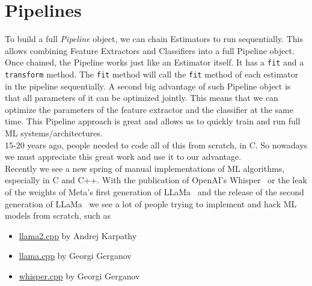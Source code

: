 \section{Pipelines}
To build a full \textit{Pipeline} object, we can chain Estimators to run sequentially. This allows combining Feature Extractors and Classifiers into a full Pipeline object.
Once chained, the Pipeline works just like an Estimator itself. It has a \lstinline{fit} and a \lstinline{transform} method. The \lstinline{fit} method will call the \lstinline{fit} method of each estimator in the pipeline sequentially.
A second big advantage of such Pipeline object is that all parameters of it can be optimized jointly. This means that we can optimize the parameters of the feature extractor and the classifier at the same time.
This Pipeline approach is great and allows us to quickly train and run full ML systems/architectures.\\
15-20 years ago, people needed to code all of this from scratch, in C.
So nowadays we must appreciate this great work and use it to our advantage.\\
Recently we see a new spring of manual implementations of ML algorithms, especially in C and C++.
With the publication of OpenAI's Whisper~\cite{radford2022whisper} or the leak of the weights of Meta's first generation of LLaMa~\cite{llama} and the release of the second generation of LLaMa~\cite{llama2} we see a lot of people trying to implement and hack ML models from scratch, such as
\begin{itemize}
  \item \href{https://github.com/karpathy/llama2.cpp}{llama2.cpp} by Andrej Karpathy
  \item \href{https://github.com/ggerganov/llama.cpp}{llama.cpp} by Georgi Gerganov
  \item \href{https://github.com/ggerganov/whisper.cpp}{whisper.cpp} by Georgi Gerganov
\end{itemize}

\framedtext{\color{red}{TODO:}}

